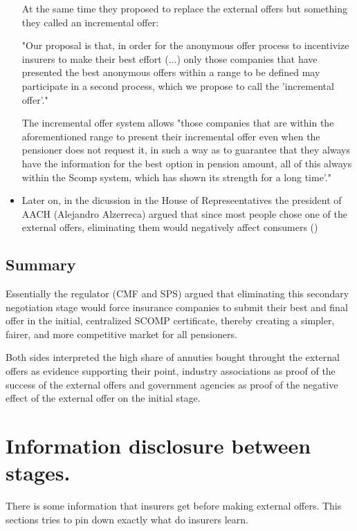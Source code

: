 \documentclass[12pt]{article}
\theoremstyle{plain}
\theoremstyle{plain}
\begin{document}
\begin{itemize}
    At the same time they proposed to replace the external offers but something they called an incremental offer: 
    
    "Our proposal is that, in order for the anonymous offer process to incentivize insurers to make their best effort (...) only those companies that have presented the best anonymous offers within a range to be defined may participate in a second process, which we propose to call the 'incremental offer'." 
    
    The incremental offer system allows "those companies that are within the aforementioned range to present their incremental offer even when the pensioner does not request it, in such a way as to guarantee that they always have the information for the best option in pension amount, all of this always within the Scomp system, which has shown its strength for a long time'."  

    \item Later on, in the dicussion in the House of Represeentatives the president of AACH (Alejandro Alzerreca) argued that since most people chose one of the external offers, eliminating them would negatively affect consumers (\cite[p.~157]{comision_trabajo_y_seguridad_social_informe_2024})

\end{itemize}
 
\subsection{Summary}

Essentially the regulator (CMF and SPS) argued that eliminating this secondary negotiation stage would force insurance companies to submit their best and final offer in the initial, centralized SCOMP certificate, thereby creating a simpler, fairer, and more competitive market for all pensioners.

Both sides interpreted the high share of annuties bought throught the external offers as evidence supporting their point, industry associations as proof of the success of the external offers and government agencies as proof of the negative effect of the external offer on the initial stage. 


\section{Information disclosure between stages.}

There is some information that insurers get before making external offers. This sections tries to pin down exactly what do insurers learn. 
\end{document}
